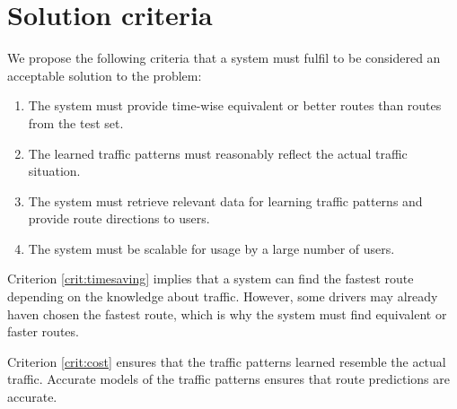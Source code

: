 \section{Solution criteria}\label{chap:solutioncriteria}
We propose the following criteria that a system must fulfil to be considered an acceptable solution to the problem:

\begin{enumerate}
	\item The system must provide time-wise equivalent or better routes than routes from the test set.\label{crit:timesaving}
	\item The learned traffic patterns must reasonably reflect the actual traffic situation.\label{crit:cost}
	\item The system must retrieve relevant data for learning traffic patterns and provide route directions to users.\label{crit:sendmessages}
	\item The system must be scalable for usage by a large number of users. \label{crit:severalconnections}
\end{enumerate}
Criterion \ref{crit:timesaving} implies that a system can find the fastest route depending on the knowledge about traffic. However, some drivers may already haven chosen the fastest route, which is why the system must find equivalent or faster routes.

Criterion \ref{crit:cost} ensures that the traffic patterns learned resemble the actual traffic. Accurate models of the traffic patterns ensures that route predictions are accurate. 

